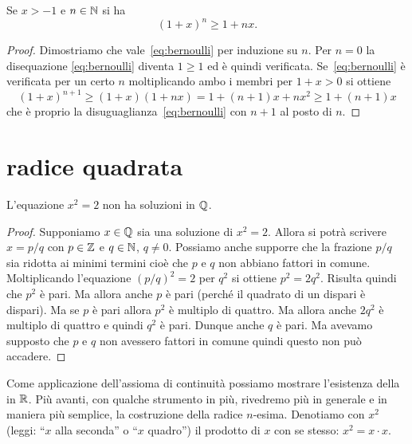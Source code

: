 \begin{theorem}
\label{th:disuguaglianza_bernoulli}%
\mymark{**}%
%
%
%
Se $x > -1$ e $n\in \mathbb N$ si ha
\begin{equation}
\label{eq:bernoulli}
(1+x)^n \ge 1 + nx.
\end{equation}
\end{theorem}
%
\begin{proof}
\mymark{**}
Dimostriamo che vale~\eqref{eq:bernoulli}
per induzione su $n$.
Per $n=0$ la disequazione \eqref{eq:bernoulli} diventa $1\ge 1$
ed è quindi verificata.
Se~\eqref{eq:bernoulli}
è verificata per un certo $n$
moltiplicando ambo i membri per $1+x > 0$ si ottiene
\[
(1+x)^{n+1} \ge (1+x) (1+nx) = 1 + (n+1)x + n x^2
\ge 1 + (n+1)x
\]
che è proprio la disuguaglianza~\eqref{eq:bernoulli}
con $n+1$ al posto di $n$.
\end{proof}

\section{radice quadrata}
\label{sec:radice_quadrata}

\begin{theorem}
\mymark{**}%
\label{th:pitagora}
L'equazione $x^2=2$ non ha soluzioni in $\mathbb Q$.
\end{theorem}
%
\begin{proof}
\mymark{*}%
Supponiamo $x\in \mathbb Q$ sia una soluzione di $x^2=2$.
Allora si potrà scrivere $x=p/q$ con $p\in \mathbb Z$ e $q\in \mathbb N$, $q\neq 0$.
Possiamo anche supporre che la frazione $p/q$ sia ridotta ai minimi
termini cioè che $p$ e $q$ non abbiano fattori in comune.
Moltiplicando l'equazione
$(p/q)^2=2$ per $q^2$ si ottiene $p^2 = 2 q^2$.
Risulta quindi che $p^2$ è pari.
Ma allora anche $p$ è pari (perché il quadrato di un dispari è dispari).
Ma se $p$ è pari allora $p^2$ è multiplo di quattro.
Ma allora anche $2q^2$ è multiplo di quattro e quindi $q^2$ è pari.
Dunque anche $q$ è pari. Ma avevamo supposto che $p$ e $q$ non avessero
fattori in comune quindi questo non può accadere.
\end{proof}

Come applicazione dell'assioma di continuità possiamo mostrare l'esistenza
della  in $\mathbb R$.
Più avanti, con qualche strumento in più, rivedremo più in generale
e in maniera più semplice, la costruzione della radice $n$-esima.
Denotiamo con $x^2$ (leggi: ``$x$ alla seconda'' o ``$x$ quadro'') il prodotto di $x$ con se stesso: $x^2 = x\cdot x$.


